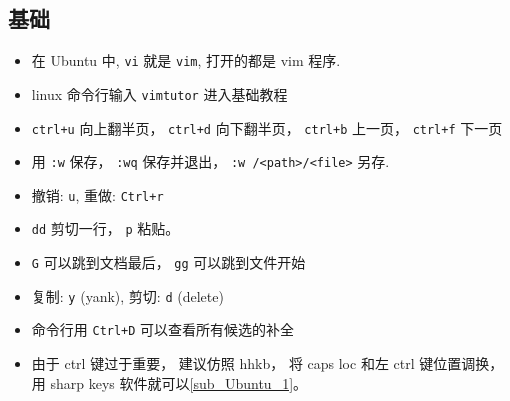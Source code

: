 
\begin{issues}
\issueDraft
\end{issues}

\subsection{基础}
\begin{itemize}
\item 在 Ubuntu 中, \verb`vi` 就是 \verb`vim`, 打开的都是 vim 程序.
\item linux 命令行输入 \verb`vimtutor` 进入基础教程
\item \verb`ctrl+u` 向上翻半页， \verb|ctrl+d| 向下翻半页， \verb|ctrl+b| 上一页， \verb|ctrl+f| 下一页
\item 用 \verb|:w| 保存， \verb|:wq| 保存并退出， \verb`:w /<path>/<file>` 另存.
\item 撤销: \verb`u`, 重做: \verb`Ctrl+r`
\item \verb`dd` 剪切一行， \verb|p| 粘贴。
\item \verb`G` 可以跳到文档最后， \verb`gg` 可以跳到文件开始
\item 复制: \verb`y` (yank), 剪切: \verb`d` (delete)
\item 命令行用 \verb`Ctrl+D` 可以查看所有候选的补全
\item 由于 ctrl 键过于重要， 建议仿照 hhkb， 将 caps loc 和左 ctrl 键位置调换， 用 sharp keys 软件就可以\autoref{sub_Ubuntu_1}。
\end{itemize}


